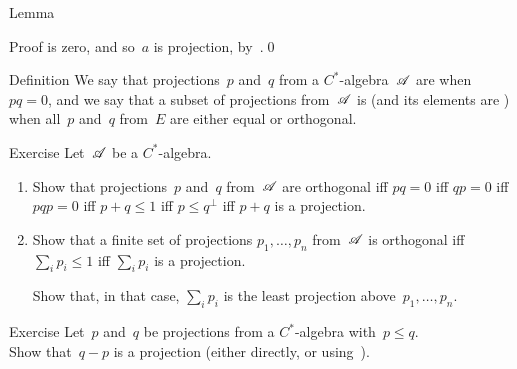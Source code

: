 \documentclass[a]{subfiles}
\begin{document}
\begin{parsec}
\begin{point}{Lemma}
\begin{point}{Proof}
is zero, and so~$a$ is projection, by~.\qed
\end{point}
\end{point}
\begin{point}{Definition}%
We say that projections~$p$ and~$q$
from a $C^*$-algebra~$\mathscr{A}$ are 
when~$pq=0$,
and we say that a subset of projections
from~$\mathscr{A}$ is 
(and its elements are )
when all~$p$ and~$q$ from~$E$
are either equal or orthogonal.
\end{point}
\begin{point}{Exercise}%
Let~$\mathscr{A}$ be a $C^*$-algebra.
\begin{enumerate}
\item
Show that projections~$p$ and~$q$ from~$\mathscr{A}$
are orthogonal iff $pq=0$ iff $qp=0$ iff $pqp=0$
iff $p+q\leq 1$ iff $p\leq q^\perp$
iff $p+q$ is a projection.
\item
Show that a finite set of  projections $p_1,\dotsc,p_n$
from~$\mathscr{A}$ is orthogonal
iff~$\sum_i p_i \leq 1$
iff $\sum_i p_i$ is a projection.

Show that, in that case, $\sum_i p_i$ is the least projection
above~$p_1,\dotsc,p_n$.
\end{enumerate}
\end{point}
\begin{point}{Exercise}%
Let~$p$ and~$q$ be projections from a $C^*$-algebra
with~$p\leq q$.\\
Show that~$q-p$ is a projection
(either directly, or using~).
\end{point}
\end{parsec}
\end{document}

